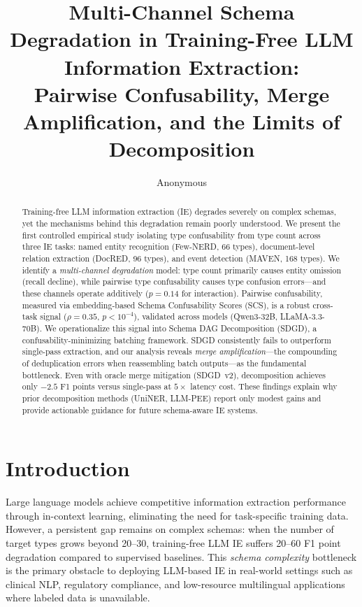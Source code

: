 \documentclass[11pt,a4paper]{article}
\title{Multi-Channel Schema Degradation in Training-Free LLM Information Extraction:\\Pairwise Confusability, Merge Amplification, and the Limits of Decomposition}
\author{Anonymous}
\date{}
\begin{document}
\maketitle

\begin{abstract}
Training-free LLM information extraction (IE) degrades severely on complex schemas, yet the mechanisms behind this degradation remain poorly understood. We present the first controlled empirical study isolating type confusability from type count across three IE tasks: named entity recognition (Few-NERD, 66 types), document-level relation extraction (DocRED, 96 types), and event detection (MAVEN, 168 types). We identify a \emph{multi-channel degradation} model: type count primarily causes entity omission (recall decline), while pairwise type confusability causes type confusion errors---and these channels operate additively ($p=0.14$ for interaction). Pairwise confusability, measured via embedding-based Schema Confusability Scores (SCS), is a robust cross-task signal ($\rho=0.35$, $p<10^{-4}$), validated across models (Qwen3-32B, LLaMA-3.3-70B). We operationalize this signal into Schema DAG Decomposition (SDGD), a confusability-minimizing batching framework. SDGD consistently fails to outperform single-pass extraction, and our analysis reveals \emph{merge amplification}---the compounding of deduplication errors when reassembling batch outputs---as the fundamental bottleneck. Even with oracle merge mitigation (SDGD~v2), decomposition achieves only $-2.5$ F1 points versus single-pass at $5\times$ latency cost. These findings explain why prior decomposition methods (UniNER, LLM-PEE) report only modest gains and provide actionable guidance for future schema-aware IE systems.
\end{abstract}

\section{Introduction}

Large language models achieve competitive information extraction performance through in-context learning, eliminating the need for task-specific training data. However, a persistent gap remains on complex schemas: when the number of target types grows beyond 20--30, training-free LLM IE suffers 20--60 F1 point degradation compared to supervised baselines. This \emph{schema complexity} bottleneck is the primary obstacle to deploying LLM-based IE in real-world settings such as clinical NLP, regulatory compliance, and low-resource multilingual applications where labeled data is unavailable.
\end{document}
